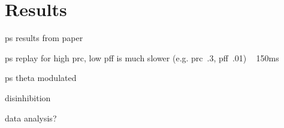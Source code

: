 \section{Results}

ps results from paper

ps replay for high prc, low pff is much slower (e.g. prc~.3, pff~.01) ~ 150ms


ps theta modulated


disinhibition


data analysis?
